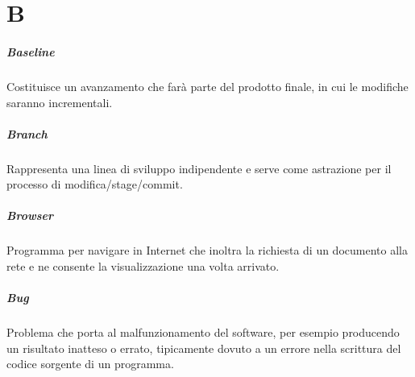 \chapter{B}

\paragraph*{Baseline}
Costituisce un avanzamento che farà parte del prodotto finale, in cui le modifiche saranno incrementali.

\paragraph*{Branch}
Rappresenta una linea di sviluppo indipendente e serve come astrazione per il processo di modifica/stage/commit.

\paragraph*{Browser}
Programma per navigare in Internet che inoltra la richiesta di un documento alla rete e ne consente la visualizzazione una volta arrivato.

\paragraph*{Bug}
Problema che porta al malfunzionamento del software, per esempio producendo un risultato inatteso o errato, tipicamente dovuto a un errore nella scrittura del codice sorgente di un programma.

